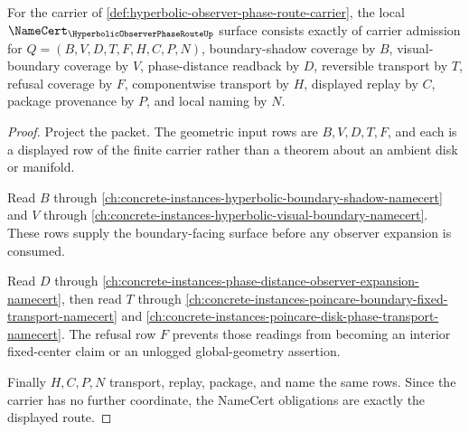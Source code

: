 \begin{theorem}
\label{thm:hyperbolic-observer-phase-route-namecert-obligations}
For the carrier of \autoref{def:hyperbolic-observer-phase-route-carrier}, the local $\NameCert_{\HyperbolicObserverPhaseRouteUp}$ surface consists exactly of carrier admission for $Q=(B,V,D,T,F,H,C,P,N)$, boundary-shadow coverage by $B$, visual-boundary coverage by $V$, phase-distance readback by $D$, reversible transport by $T$, refusal coverage by $F$, componentwise transport by $H$, displayed replay by $C$, package provenance by $P$, and local naming by $N$.
\end{theorem}
\begin{proof}
Project the packet. The geometric input rows are $B,V,D,T,F$, and each is a displayed row of the finite carrier rather than a theorem about an ambient disk or manifold.

Read $B$ through \autoref{ch:concrete-instances-hyperbolic-boundary-shadow-namecert} and $V$ through \autoref{ch:concrete-instances-hyperbolic-visual-boundary-namecert}. These rows supply the boundary-facing surface before any observer expansion is consumed.

Read $D$ through \autoref{ch:concrete-instances-phase-distance-observer-expansion-namecert}, then read $T$ through \autoref{ch:concrete-instances-poincare-boundary-fixed-transport-namecert} and \autoref{ch:concrete-instances-poincare-disk-phase-transport-namecert}. The refusal row $F$ prevents those readings from becoming an interior fixed-center claim or an unlogged global-geometry assertion.

Finally $H,C,P,N$ transport, replay, package, and name the same rows. Since the carrier has no further coordinate, the NameCert obligations are exactly the displayed route.
\end{proof}

